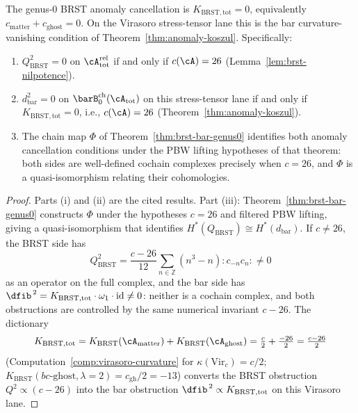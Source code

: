 \begin{corollary}
\label{cor:anomaly-physical-genus0-vol1}
The genus-$0$ BRST anomaly cancellation is
$K_{\mathrm{BRST,tot}}=0$, equivalently
$c_{\mathrm{matter}}+c_{\mathrm{ghost}}=0$. On the Virasoro
stress-tensor lane this is the bar curvature-vanishing condition of
Theorem~\textup{\ref{thm:anomaly-koszul}}. Specifically:
\begin{enumerate}[label=\textup{(\roman*)}]
\item $Q_{\mathrm{BRST}}^2 = 0$ on $\cA_{\mathrm{tot}}^{\mathrm{rel}}$
 if and only if $c(\cA) = 26$ \textup{(}Lemma~\textup{\ref{lem:brst-nilpotence})}.
\item $d_{\mathrm{bar}}^2 = 0$ on $\barB^{\mathrm{ch}}_0(\cA_{\mathrm{tot}})$
 on this stress-tensor lane if and only if
 $K_{\mathrm{BRST,tot}}=0$, i.e., $c(\cA)=26$
 \textup{(}Theorem~\textup{\ref{thm:anomaly-koszul})}.
\item The chain map $\Phi$ of Theorem~\textup{\ref{thm:brst-bar-genus0}}
 identifies both anomaly cancellation conditions under the PBW lifting
 hypotheses of that theorem: both sides are well-defined cochain
 complexes precisely when $c = 26$, and $\Phi$ is a quasi-isomorphism
 relating their cohomologies.
\end{enumerate}
\end{corollary}

\begin{proof}
Parts (i) and (ii) are the cited results. Part (iii):
Theorem~\ref{thm:brst-bar-genus0} constructs $\Phi$ under
the hypotheses $c = 26$ and filtered PBW lifting, giving a quasi-isomorphism that
identifies $H^*(Q_{\mathrm{BRST}}) \cong H^*(d_{\mathrm{bar}})$.
If $c \neq 26$, the BRST side has
\[
Q_{\mathrm{BRST}}^2
=\frac{c-26}{12}\sum_{n\in\mathbb Z}(n^3-n){:}c_{-n}c_n{:}\neq0
\]
as an operator on the full complex,
and the bar side has
$\dfib^{\,2}=K_{\mathrm{BRST,tot}}\cdot\omega_1
\cdot \mathrm{id} \neq 0$: neither is a cochain complex,
and both obstructions are controlled by the same numerical invariant
$c - 26$. The dictionary
\[
K_{\mathrm{BRST,tot}}
= K_{\mathrm{BRST}}(\cA_{\mathrm{matter}})
 + K_{\mathrm{BRST}}(\cA_{\mathrm{ghost}})
= \tfrac{c}{2} + \tfrac{-26}{2}
= \tfrac{c-26}{2}
\]
(Computation~\ref{comp:virasoro-curvature} for $\kappa(\mathrm{Vir}_c) = c/2$;
$K_{\mathrm{BRST}}(\text{$bc$-ghost}, \lambda{=}2)
=c_{\mathrm{gh}}/2=-13$)
converts the BRST obstruction $Q^2 \propto (c-26)$ into
the bar obstruction
$\dfib^{\,2}\propto K_{\mathrm{BRST,tot}}$ on this Virasoro lane.
\end{proof}

